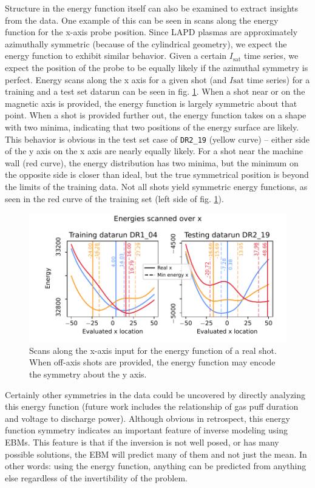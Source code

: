 Structure in the energy function itself can also be examined to extract insights from the data. One example of this can be seen in scans along the energy function for the x-axis probe position. Since LAPD plasmas are approximately azimuthally symmetric (because of the cylindrical geometry), we expect the energy function to exhibit similar behavior. Given a certain $I_\text{sat}$ time series, we expect the position of the probe to be equally likely if the azimuthal symmetry is perfect. Energy scans along the x axis for a given shot (and $I\text{sat}$ time series) for a training and a test set datarun can be seen in fig. \ref{fig:energy_x_scan}. When a shot near or on the magnetic axis is provided, the energy function is largely symmetric about that point. When a shot is provided further out, the energy function takes on a shape with two minima, indicating that two positions of the energy surface are likely. This behavior is obvious in the test set case of \texttt{DR2\_19} (yellow curve) -- either side of the y axis on the x axis are nearly equally likely. For a shot near the machine wall (red curve), the energy distribution has two minima, but the minimum on the opposite side is closer than ideal, but the true symmetrical position is beyond the limits of the training data. Not all shots yield symmetric energy functions, as seen in the red curve of the training set (left side of fig. \ref{fig:energy_x_scan}). 

\begin{figure}
	\centering
	\includegraphics[width=400pt]{figures/energy_x_scan_train-test_39-0}
	\caption{\label{fig:energy_x_scan}Scans along the x-axis input for the energy function of a real shot. When off-axis shots are provided, the energy function may encode the symmetry about the y axis.}
\end{figure}

Certainly other symmetries in the data could be uncovered by directly analyzing this energy function (future work includes the relationship of gas puff duration and voltage to discharge power). Although obvious in retrospect, this energy function symmetry  indicates an important feature of inverse modeling using EBMs. This feature is that if the inversion is not well posed, or has many possible solutions, the EBM will predict many of them and not just the mean. In other words: using the energy function, anything can be predicted from anything else regardless of the invertibility of the problem.


